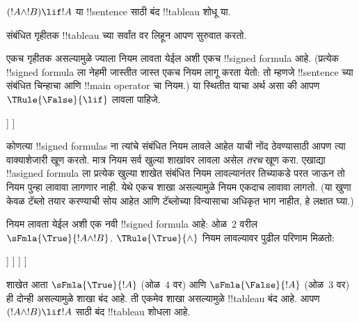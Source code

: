 \documentclass[../../../include/open-logic-section]{subfiles}
\begin{document}
      {}
      {}


\begin{ex}
$(!A \land !B) \lif !A$ या !!{sentence} साठी बंद !!{tableau} शोधू या.

संबंधित गृहीतक !!{tableau} च्या सर्वांत वर लिहून आपण सुरुवात करतो.
\begin{oltableau}
  [\sFmla{\False}{(\formula{A} \land \formula{B}) \lif \formula{A}},
    just = \TAss]
\end{oltableau}

एकच गृहीतक असल्यामुळे ज्याला नियम लावता येईल अशी एकच !!{signed formula}
आहे. (प्रत्येक !!{signed formula} ला नेहमी जास्तीत जास्त एकच नियम लागू
करता येतो: तो म्हणजे !!{sentence} च्या संबंधित चिन्हाचा आणि
!!{main operator} चा नियम.) या स्थितीत याचा अर्थ असा की आपण
$\TRule{\False}{\lif}$ लावला पाहिजे.
\begin{oltableau}
  [\sFmla{\False}{(\formula{A} \land \formula{B}) \lif \formula{A}},
    checked, just = \TAss
    [\sFmla{\True}{\formula{A} \land \formula{B}},
      just={\TRule{\False}{\lif}[1]}
      [\sFmla{\False}{\formula{A}}, just={\TRule{\False}{\lif}[1]}]
    ]
  ]
\end{oltableau}
कोणत्या !!{signed formula}s ना त्यांचे संबंधित नियम लावले आहेत याची नोंद
ठेवण्यासाठी आपण त्या वाक्याशेजारी खूण करतो. मात्र नियम सर्व खुल्या शाखांवर
लावला असेल \emph{तरच} खूण करा. एखाद्या !!a{signed formula} ला प्रत्येक
खुल्या शाखेत संबंधित नियम लावल्यानंतर तिच्याकडे परत जाऊन तो नियम पुन्हा
लावावा लागणार नाही. येथे एकच शाखा असल्यामुळे नियम एकदाच लावावा लागतो.
(या खुणा केवळ टॅब्लो तयार करण्याची सोय आहेत आणि टॅब्लोच्या विन्यासाचा
अधिकृत भाग नाहीत, हे लक्षात घ्या.)

नियम लावता येईल अशी एक नवी !!{signed formula} आहे: ओळ~$2$ वरील
$\sFmla{\True}{!A \land !B}$. $\TRule{\True}{\land}$ नियम लावल्यावर
पुढील परिणाम मिळतो:
\begin{oltableau}
  [\sFmla{\False}{(\formula{A} \land \formula{B}) \lif \formula{A}},
    checked, just = \TAss
    [\sFmla{\True}{\formula{A} \land \formula{B}},
      just={\TRule{\False}{\lif}[1]}, checked
      [\sFmla{\False}{\formula{A}}, just={\TRule{\False}{\lif}[1]}
        [\sFmla{\True}{\formula{A}}, just={\TRule{\True}{\land}[2]}
          [\sFmla{\True}{\formula{B}}, just={\TRule{\True}{\land}[2]}, close
          ]
        ]
      ]
    ]
  ]
\end{oltableau}
शाखेत आता $\sFmla{\True}{!A}$ (ओळ~$4$ वर) आणि
$\sFmla{\False}{!A}$ (ओळ~$3$ वर) ही दोन्ही असल्यामुळे शाखा बंद आहे.
ती एकमेव शाखा असल्यामुळे !!{tableau} बंद आहे. आपण
~$(!A \land !B) \lif !A$ साठी बंद !!{tableau} शोधला आहे.
\end{ex}
\end{document}
